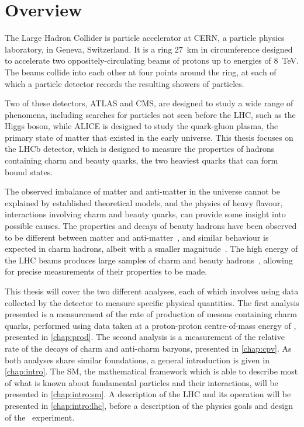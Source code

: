 \chapter{Overview}
\label{chap:intro:overview}

The Large Hadron Collider is particle accelerator at CERN, a particle physics 
laboratory, in Geneva, Switzerland.
It is a ring \SI{27}{\kilo\metre} in circumference designed to accelerate two 
oppositely-circulating beams of protons up to energies of \SI{8}{\TeV}.
The beams collide into each other at four points around the ring, at each of 
which a particle detector records the resulting showers of particles.

Two of these detectors, ATLAS and CMS, are designed to study a wide range of 
phenomena, including searches for particles not seen before the \ac{LHC}, such 
as the Higgs boson, while ALICE is designed to study the quark-gluon plasma, 
the primary state of matter that existed in the early universe.
This thesis focuses on the LHCb detector, which is designed to measure the 
properties of hadrons containing charm and beauty quarks, the two heaviest 
quarks that can form bound states.

The observed imbalance of matter and anti-matter in the universe cannot be 
explained by established theoretical models, and the physics of heavy flavour, 
interactions involving charm and beauty quarks, can provide some insight into 
possible causes.
The properties and decays of beauty hadrons have been observed to be different 
between matter and 
anti-matter~\cite{Aubert:2001nu,Abe:2001xe,Aaij:2012kz,Aaij:2013iua,Aaij:2016cla}, 
and similar behaviour is expected in charm hadrons, albeit with a smaller 
magnitude~\cite{Grossman:2006jg}.
The high energy of the \ac{LHC} beams produces large samples of charm and 
beauty hadrons~\cite{LHCb-PAPER-2012-041,LHCb-PAPER-2013-004}, allowing for 
precise measurements of their properties to be made.

This thesis will cover the two different analyses, each of which involves using 
data collected by the detector to measure specific physical quantities.
The first analysis presented is a measurement of the rate of production of 
mesons containing charm quarks, performed using data taken at a proton-proton 
centre-of-mass energy of \runtwocom, presented in \cref{chap:prod}.
The second analysis is a measurement of the relative rate of the decays of 
charm and anti-charm baryons, presented in \cref{chap:cpv}.
As both analyses share similar foundations, a general introduction is given in 
\cref{chap:intro}.
The \acl{SM}, the mathematical framework which is able to describe most of what 
is known about fundamental particles and their interactions, will be presented 
in \cref{chap:intro:sm}.
A description of the \acl{LHC} and its operation will be presented in 
\cref{chap:intro:lhc}, before a description of the physics goals and design of 
the \lhcb\ experiment.
